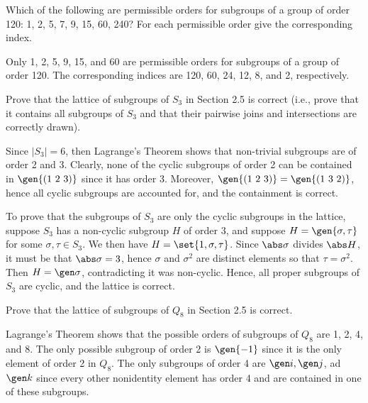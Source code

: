 \begin{problems}
    \item Which of the following are permissible orders for subgroups of a group of order 120: 1, 2, 5, 7, 9, 15, 60, 240? For each permissible order give the corresponding index.
    \begin{sol}
        Only 1, 2, 5, 9, 15, and 60 are permissible orders for subgroups of a group of order 120. The corresponding indices are 120, 60, 24, 12, 8, and 2, respectively.
    \end{sol}
    \item Prove that the lattice of subgroups of $S_3$ in Section 2.5 is correct (i.e., prove that it contains all subgroups of $S_3$ and that their pairwise joins and intersections are correctly drawn).
    \begin{sol}
        Since $|S_3| = 6$, then Lagrange's Theorem shows that non-trivial subgroups are of order 2 and 3. Clearly, none of the cyclic subgroups of order 2 can be contained in $\gen{(1\ 2\ 3)}$ since it has order 3. Moreover, $\gen{(1\ 2\ 3)} = \gen{(1\ 3\ 2)}$, hence all cyclic subgroups are accounted for, and the containment is correct.

        To prove that the subgroups of $S_3$ are only the cyclic subgroups in the lattice, suppose $S_3$ has a non-cyclic subgroup $H$ of order 3, and suppose $H = \gen{\sigma, \tau}$ for some $\sigma, \tau \in S_3$. We then have $H = \set{1, \sigma, \tau}$. Since $\abs\sigma$ divides $\abs H$, it must be that $\abs\sigma = 3$, hence $\sigma$ and $\sigma^2$ are distinct elements so that $\tau = \sigma^2$. Then $H = \gen\sigma$, contradicting it was non-cyclic. Hence, all proper subgroups of $S_3$ are cyclic, and the lattice is correct.
    \end{sol}
    \item Prove that the lattice of subgroups of $Q_8$ in Section 2.5 is correct.
    \begin{sol}
        Lagrange's Theorem shows that the possible orders of subgroups of $Q_8$ are 1, 2, 4, and 8. The only possible subgroup of order 2 is $\gen{-1}$ since it is the only element of order 2 in $Q_8$. The only subgroups of order 4 are $\gen i, \gen j$, ad $\gen k$ since every other nonidentity element has order 4 and are contained in one of these subgroups.


\end{sol}
\end{problems}
